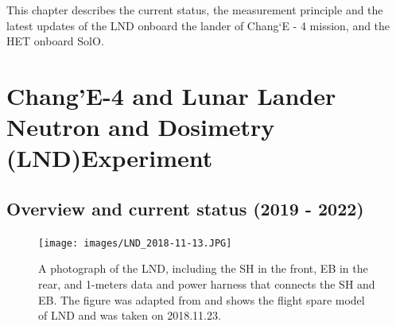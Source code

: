 This chapter describes the current status, the measurement principle and the latest updates of the \ac{LND} onboard the lander of Chang`E - 4 mission, and the \ac{HET} onboard \ac{SolO}. 

\section{Chang'E-4 and Lunar Lander Neutron and Dosimetry (LND)Experiment}
\label{sec:change_4_LND}

\subsection*{Overview and current status (2019 - 2022)}

\begin{figure}
    \centering
    \texttt{[image: images/LND\_2018-11-13.JPG]}
    \caption[A photograph of the \ac{LND}]{A photograph of the \ac{LND}, including the \ac{SH} in the front, \ac{EB} in the rear, and 1-meters data and power harness that connects the \ac{SH} and \ac{EB}. The figure was adapted from \citet{Wimmer2020SSRv} and shows the flight spare model of LND and was taken on 2018.11.23.}
    \label{Fig:LND_instrument}
\end{figure}


